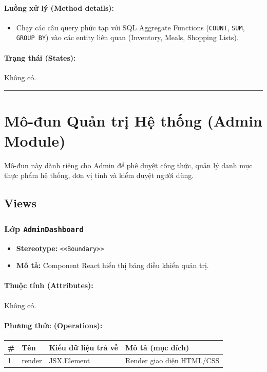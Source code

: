 \documentclass[12pt,a4paper]{article}
\begin{document}
\paragraph{Luồng xử lý (Method details):}
\begin{itemize}[leftmargin=*]
    \item Chạy các câu query phức tạp với SQL Aggregate Functions (\texttt{COUNT}, \texttt{SUM}, \texttt{GROUP BY}) vào các entity liên quan (Inventory, Meals, Shopping Lists).
\end{itemize}


\paragraph{Trạng thái (States):}
Không có.

\vskip 0.5cm
\noindent\rule{\textwidth}{0.5pt}
\vskip 0.5cm

\section{Mô-đun Quản trị Hệ thống (Admin Module)}

Mô-đun này dành riêng cho Admin để phê duyệt công thức, quản lý danh mục thực phẩm hệ thống, đơn vị tính và kiểm duyệt người dùng.

\subsection{Views}

\subsubsection{Lớp \texttt{AdminDashboard}}
\begin{itemize}[leftmargin=*]
    \item \textbf{Stereotype:} \texttt{\textless{}\textless{}Boundary\textgreater{}\textgreater{}}
    \item \textbf{Mô tả:} Component React hiển thị bảng điều khiển quản trị.
\end{itemize}

\paragraph{Thuộc tính (Attributes):}
Không có.

\paragraph{Phương thức (Operations):}
\begin{longtable}{|p{0.6cm}|p{3.8cm}|p{2.6cm}|p{6.5cm}|}
\hline
\textbf{\#} & \textbf{Tên} & \textbf{Kiểu dữ liệu trả về} & \textbf{Mô tả (mục đích)} \\ \hline
\endhead
1 & render & JSX.Element & Render giao diện HTML/CSS \\ \hline
\end{longtable}
\end{document}
